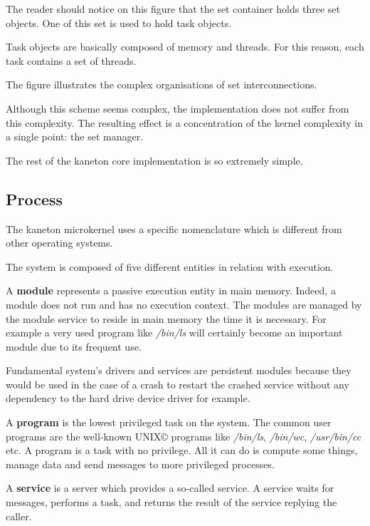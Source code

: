 \begin{multicols}{2}

The reader should notice on this figure that the set container holds
three set objects. One of this set is used to hold task objects.

Task objects are basically composed of memory and threads. For this
reason, each task contains a set of threads.

The figure illustrates the complex organisations of set interconnections.

Although this scheme seems complex, the implementation does not
suffer from this complexity. The resulting effect is a concentration
of the kernel complexity in a single point: the set manager.

The rest of the kaneton core implementation is so extremely simple.

%
%

\subsection{Process}

The kaneton microkernel uses a specific nomenclature which is different
from other operating systems.

The system is composed of five different entities in relation with execution.

A \textbf{module} represents a passive execution entity in main memory.
Indeed, a module does not run and has no execution context. The modules are
managed by the module service to reside in main memory the time it is
necessary. For example a very used program like \textit{/bin/ls} will
certainly become an important module due to its frequent use.

Fundamental system's drivers and services are persistent modules because
they would be used in the case of a crash to restart the crashed service
without any dependency to the hard drive device driver for example.

A \textbf{program} is the lowest privileged task on the system.
The common user programs are the well-known UNIX{\scriptsize \copyright}
programs like \textit{/bin/ls}, \textit{/bin/wc}, \textit{/usr/bin/cc} etc.
A program is a task with no privilege. All it can do is compute some things,
manage data and send messages to more privileged processes.

A \textbf{service} is a server which provides a so-called service. A service
waits for messages, performs a task, and returns the result of the service
replying the caller.


\end{multicols}
